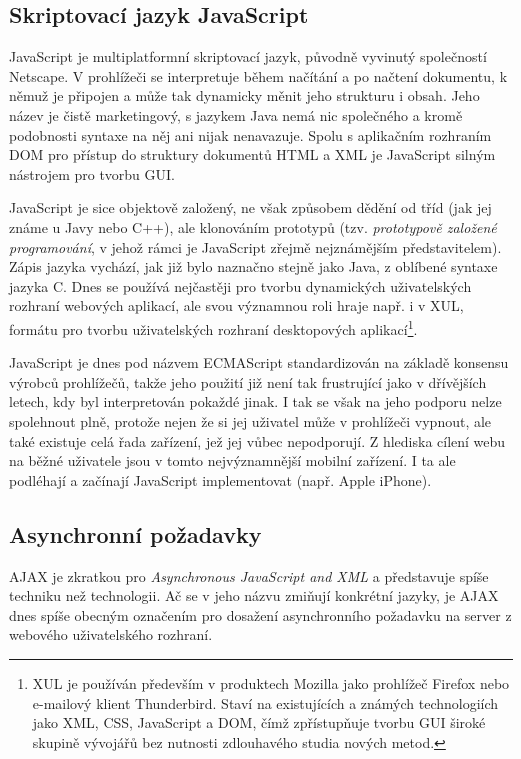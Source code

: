 \subsection{Skriptovací jazyk JavaScript}\label{javaScript}
JavaScript je multiplatformní skriptovací jazyk, původně vyvinutý
společností Netscape. V prohlížeči se interpretuje během načítání a po
načtení dokumentu, k němuž je připojen a může tak dynamicky měnit
jeho strukturu i obsah. Jeho název je čistě marketingový, s jazykem
Java nemá nic společného a kromě podobnosti syntaxe na něj ani nijak
nenavazuje. Spolu s aplikačním rozhraním DOM pro přístup do struktury
dokumentů HTML a XML je JavaScript silným nástrojem pro tvorbu GUI.
\cite{jsBook}

JavaScript je sice objektově založený, ne však způsobem
dědění od tříd (jak jej známe u Javy nebo C++), ale klonováním
prototypů (tzv. {\it prototypově založené programování}, v jehož rámci
je JavaScript zřejmě nejznámějším představitelem). Zápis jazyka vychází,
jak již bylo naznačno stejně jako Java, z oblíbené syntaxe jazyka C.
Dnes se používá nejčastěji pro tvorbu dynamických uživatelských
rozhraní webových aplikací, ale svou významnou roli hraje např. i v
XUL, formátu pro tvorbu uživatelských rozhraní desktopových
aplikací\footnote{XUL je používán především v produktech Mozilla jako
prohlížeč Firefox nebo e-mailový klient Thunderbird. Staví na
existujících a známých technologiích jako XML, CSS, JavaScript a DOM,
čímž zpřístupňuje tvorbu GUI široké skupině vývojářů bez nutnosti
zdlouhavého studia nových metod.}.

JavaScript je dnes pod názvem ECMAScript standardizován na základě
konsensu výrobců prohlížečů, takže jeho použití již není tak
frustrující jako v dřívějších letech, kdy byl interpretován pokaždé
jinak. I tak se však na jeho podporu nelze spolehnout plně, protože
nejen že si jej uživatel může v prohlížeči vypnout, ale také existuje
celá řada zařízení, jež jej vůbec nepodporují. Z
hlediska cílení webu na běžné uživatele jsou v tomto nejvýznamnější
mobilní zařízení. I ta ale podléhají a začínají JavaScript
implementovat (např. Apple iPhone).

\subsection{Asynchronní požadavky}\label{ajax}
AJAX je zkratkou pro {\it Asynchronous JavaScript and XML} a
představuje spíše techniku než technologii. Ač se v jeho názvu
zmiňují konkrétní jazyky, je AJAX dnes spíše obecným označením pro
dosažení asynchronního požadavku na server z webového uživatelského
rozhraní. \cite{ajax}

